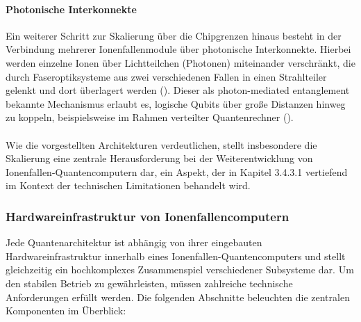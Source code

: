 \medskip

\paragraph{Photonische Interkonnekte}

Ein weiterer Schritt zur Skalierung über die Chipgrenzen hinaus besteht in der Verbindung mehrerer Ionenfallenmodule über photonische Interkonnekte. Hierbei werden einzelne Ionen über Lichtteilchen (Photonen) miteinander verschränkt, die durch Faseroptiksysteme aus zwei verschiedenen Fallen in einen Strahlteiler gelenkt und dort überlagert werden (\cite{strohmIonBasedQuantumComputing2024}). Dieser als photon-mediated entanglement bekannte Mechanismus erlaubt es, logische Qubits über große Distanzen hinweg zu koppeln, beispielsweise im Rahmen verteilter Quantenrechner (\cite{strohmIonBasedQuantumComputing2024}).
\\\\
Wie die vorgestellten Architekturen verdeutlichen, stellt insbesondere die Skalierung eine zentrale Herausforderung bei der Weiterentwicklung von Ionenfallen-Quantencomputern dar, ein Aspekt, der in Kapitel 3.4.3.1 vertiefend im Kontext der technischen Limitationen behandelt wird.

\subsubsection{Hardwareinfrastruktur von Ionenfallencomputern}
Jede Quantenarchitektur ist abhängig von ihrer eingebauten Hardwareinfrastruktur innerhalb eines Ionenfallen-Quantencomputers und stellt gleichzeitig ein hochkomplexes Zusammenspiel verschiedener Subsysteme dar. Um den stabilen Betrieb zu gewährleisten, müssen zahlreiche technische Anforderungen erfüllt werden. Die folgenden Abschnitte beleuchten die zentralen Komponenten im Überblick: \\

